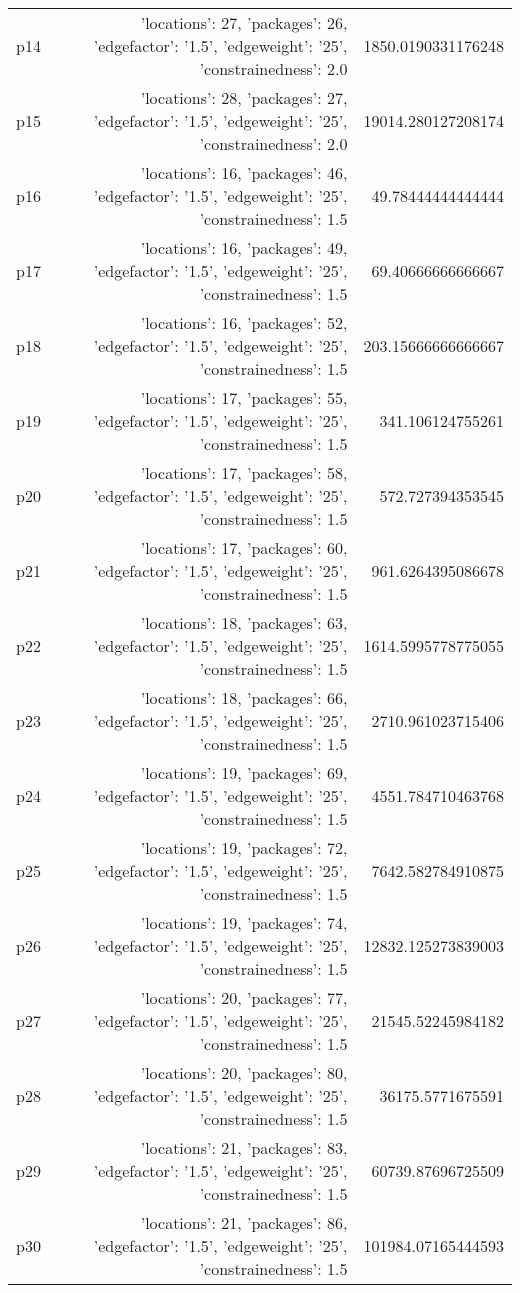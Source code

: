 \documentclass{article}
\begin{document}
\begin{center}
\begin{tabular}{r|r|r}
  p14&{'locations': 27, 'packages': 26, 'edgefactor': '1.5', 'edgeweight': '25', 'constrainedness': 2.0}&1850.0190331176248\\
  p15&{'locations': 28, 'packages': 27, 'edgefactor': '1.5', 'edgeweight': '25', 'constrainedness': 2.0}&19014.280127208174\\
  p16&{'locations': 16, 'packages': 46, 'edgefactor': '1.5', 'edgeweight': '25', 'constrainedness': 1.5}&49.78444444444444\\
  p17&{'locations': 16, 'packages': 49, 'edgefactor': '1.5', 'edgeweight': '25', 'constrainedness': 1.5}&69.40666666666667\\
  p18&{'locations': 16, 'packages': 52, 'edgefactor': '1.5', 'edgeweight': '25', 'constrainedness': 1.5}&203.15666666666667\\
  p19&{'locations': 17, 'packages': 55, 'edgefactor': '1.5', 'edgeweight': '25', 'constrainedness': 1.5}&341.106124755261\\
  p20&{'locations': 17, 'packages': 58, 'edgefactor': '1.5', 'edgeweight': '25', 'constrainedness': 1.5}&572.727394353545\\
  p21&{'locations': 17, 'packages': 60, 'edgefactor': '1.5', 'edgeweight': '25', 'constrainedness': 1.5}&961.6264395086678\\
  p22&{'locations': 18, 'packages': 63, 'edgefactor': '1.5', 'edgeweight': '25', 'constrainedness': 1.5}&1614.5995778775055\\
  p23&{'locations': 18, 'packages': 66, 'edgefactor': '1.5', 'edgeweight': '25', 'constrainedness': 1.5}&2710.961023715406\\
  p24&{'locations': 19, 'packages': 69, 'edgefactor': '1.5', 'edgeweight': '25', 'constrainedness': 1.5}&4551.784710463768\\
  p25&{'locations': 19, 'packages': 72, 'edgefactor': '1.5', 'edgeweight': '25', 'constrainedness': 1.5}&7642.582784910875\\
  p26&{'locations': 19, 'packages': 74, 'edgefactor': '1.5', 'edgeweight': '25', 'constrainedness': 1.5}&12832.125273839003\\
  p27&{'locations': 20, 'packages': 77, 'edgefactor': '1.5', 'edgeweight': '25', 'constrainedness': 1.5}&21545.52245984182\\
  p28&{'locations': 20, 'packages': 80, 'edgefactor': '1.5', 'edgeweight': '25', 'constrainedness': 1.5}&36175.5771675591\\
  p29&{'locations': 21, 'packages': 83, 'edgefactor': '1.5', 'edgeweight': '25', 'constrainedness': 1.5}&60739.87696725509\\
  p30&{'locations': 21, 'packages': 86, 'edgefactor': '1.5', 'edgeweight': '25', 'constrainedness': 1.5}&101984.07165444593
                            \end{tabular}
                            \end{center}
                    
\end{document}
